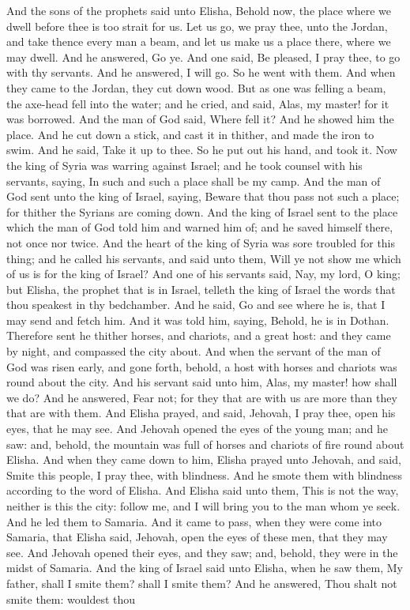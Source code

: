 And the sons of the prophets said unto Elisha, Behold now, the place where we dwell before thee is too strait for us. Let us go, we pray thee, unto the Jordan, and take thence every man a beam, and let us make us a place there, where we may dwell. And he answered, Go ye. And one said, Be pleased, I pray thee, to go with thy servants. And he answered, I will go. So he went with them. And when they came to the Jordan, they cut down wood. But as one was felling a beam, the axe-head fell into the water; and he cried, and said, Alas, my master! for it was borrowed. And the man of God said, Where fell it? And he showed him the place. And he cut down a stick, and cast it in thither, and made the iron to swim. And he said, Take it up to thee. So he put out his hand, and took it.  Now the king of Syria was warring against Israel; and he took counsel with his servants, saying, In such and such a place shall be my camp. And the man of God sent unto the king of Israel, saying, Beware that thou pass not such a place; for thither the Syrians are coming down. And the king of Israel sent to the place which the man of God told him and warned him of; and he saved himself there, not once nor twice. And the heart of the king of Syria was sore troubled for this thing; and he called his servants, and said unto them, Will ye not show me which of us is for the king of Israel? And one of his servants said, Nay, my lord, O king; but Elisha, the prophet that is in Israel, telleth the king of Israel the words that thou speakest in thy bedchamber. And he said, Go and see where he is, that I may send and fetch him. And it was told him, saying, Behold, he is in Dothan.  Therefore sent he thither horses, and chariots, and a great host: and they came by night, and compassed the city about. And when the servant of the man of God was risen early, and gone forth, behold, a host with horses and chariots was round about the city. And his servant said unto him, Alas, my master! how shall we do? And he answered, Fear not; for they that are with us are more than they that are with them. And Elisha prayed, and said, Jehovah, I pray thee, open his eyes, that he may see. And Jehovah opened the eyes of the young man; and he saw: and, behold, the mountain was full of horses and chariots of fire round about Elisha. And when they came down to him, Elisha prayed unto Jehovah, and said, Smite this people, I pray thee, with blindness. And he smote them with blindness according to the word of Elisha. And Elisha said unto them, This is not the way, neither is this the city: follow me, and I will bring you to the man whom ye seek. And he led them to Samaria.  And it came to pass, when they were come into Samaria, that Elisha said, Jehovah, open the eyes of these men, that they may see. And Jehovah opened their eyes, and they saw; and, behold, they were in the midst of Samaria. And the king of Israel said unto Elisha, when he saw them, My father, shall I smite them? shall I smite them? And he answered, Thou shalt not smite them: wouldest thou 